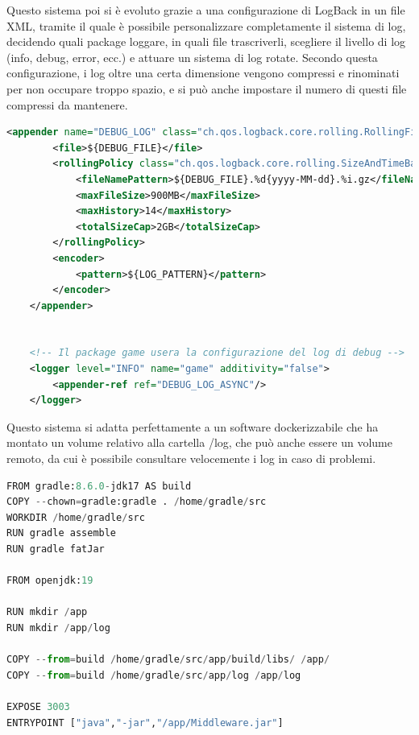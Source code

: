 Questo sistema poi si è evoluto grazie a una configurazione di LogBack in un file XML, tramite il quale è possibile personalizzare completamente il sistema di log, decidendo quali package loggare, in quali file trascriverli, scegliere il livello di log (info, debug, error, ecc.) e attuare un sistema di log rotate. Secondo questa configurazione, i log oltre una certa dimensione vengono compressi e rinominati per non occupare troppo spazio, e si può anche impostare il numero di questi file compressi da mantenere.

\begin{lstlisting}[language=Xml, caption={File configurazione Log automatici}, label=list:xml_logback]
    <appender name="DEBUG_LOG" class="ch.qos.logback.core.rolling.RollingFileAppender">
        <file>${DEBUG_FILE}</file>
        <rollingPolicy class="ch.qos.logback.core.rolling.SizeAndTimeBasedRollingPolicy">
            <fileNamePattern>${DEBUG_FILE}.%d{yyyy-MM-dd}.%i.gz</fileNamePattern>
            <maxFileSize>900MB</maxFileSize>
            <maxHistory>14</maxHistory>
            <totalSizeCap>2GB</totalSizeCap>
        </rollingPolicy>
        <encoder>
            <pattern>${LOG_PATTERN}</pattern>
        </encoder>
    </appender>


    <!-- Il package game usera la configurazione del log di debug -->
    <logger level="INFO" name="game" additivity="false">
        <appender-ref ref="DEBUG_LOG_ASYNC"/>
    </logger>

\end{lstlisting}

\vspace{1cm}

Questo sistema si adatta perfettamente a un software dockerizzabile che ha montato un volume relativo alla cartella /log, che può anche essere un volume remoto, da cui è possibile consultare velocemente i log in caso di problemi.

\begin{lstlisting}[language=Python, caption={Volume di log nel dockerfile l.13 da montare successivamente}, label=list:dockerfile_log]
FROM gradle:8.6.0-jdk17 AS build
COPY --chown=gradle:gradle . /home/gradle/src
WORKDIR /home/gradle/src
RUN gradle assemble
RUN gradle fatJar 

FROM openjdk:19

RUN mkdir /app
RUN mkdir /app/log

COPY --from=build /home/gradle/src/app/build/libs/ /app/
COPY --from=build /home/gradle/src/app/log /app/log

EXPOSE 3003
ENTRYPOINT ["java","-jar","/app/Middleware.jar"]
\end{lstlisting}


